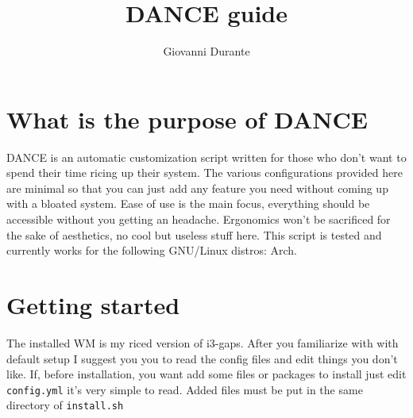 \documentclass{article}
\date{}
\title{DANCE guide}
\author{Giovanni Durante}
\begin{document}
\maketitle
\section*{What is the purpose of DANCE}
DANCE is an automatic customization script written for those who don't want to spend their time ricing up their system. The various configurations provided here are minimal so that you can just add any feature you need without coming up with a bloated system. Ease of use is the main focus, everything should be accessible without you getting an headache. Ergonomics won't be sacrificed for the sake of aesthetics, no cool but useless stuff here. This script is tested and currently works for the following GNU/Linux distros: Arch.

\section*{Getting started}
The installed WM is my riced version of i3-gaps. After you familiarize with with default setup I suggest you you to read the config files and edit things you don't like. If, before installation, you want add some files or packages to install just edit \verb|config.yml| it's very simple to read. Added files must be put in the same directory of \verb|install.sh|
\end{document}
